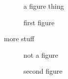 \documentclass{amsart}
\begin{document}
\begin{figure}
a figure thing
\caption{first figure}
\end{figure}

more stuff
\begin{figure}
not a figure
\caption{second figure}
\end{figure}
\end{document}
